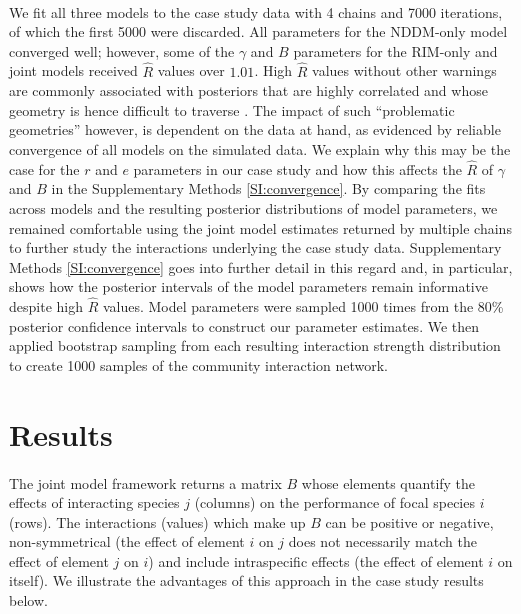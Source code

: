 \documentclass[a4,12pt]{article}
\begin{document}
\begin{refsection}
        \paragraph{}
        We fit all three models to the case study data with 4 chains and 7000 iterations, of which the first 5000 were discarded. All parameters for the NDDM-only model converged well; however, some of the $\gamma$ and $B$ parameters for the RIM-only and joint models received $\hat{R}$ values over $1.01$. High $\hat{R}$ values without other warnings are commonly associated with posteriors that are highly correlated and whose geometry is hence difficult to traverse \parencite{Team2022}. The impact of such ``problematic geometries'' however, is dependent on the data at hand, as evidenced by reliable convergence of all models on the simulated data. We explain why this may be the case for the $r$ and $e$ parameters in our case study and how this affects the $\hat{R}$ of $\gamma$ and $B$ in the Supplementary Methods \ref{SI:convergence}. By comparing the fits across models and the resulting posterior distributions of model parameters, we remained comfortable using the joint model estimates returned by multiple chains to further study the interactions underlying the case study data. Supplementary Methods \ref{SI:convergence} goes into further detail in this regard and, in particular, shows how the posterior intervals of the model parameters remain informative despite high $\hat{R}$ values. Model parameters were sampled 1000 times from the 80\% posterior confidence intervals to construct our parameter estimates. We then applied bootstrap sampling from each resulting interaction strength distribution to create 1000 samples of the community interaction network.

\section{Results}
    
    \paragraph{}
    The joint model framework returns a matrix $B$ whose elements quantify the effects of interacting species $j$ (columns) on the performance of focal species $i$ (rows). The interactions (values) which make up $B$ can be positive or negative, non-symmetrical (the effect of element $i$ on $j$ does not necessarily match the effect of element $j$ on $i$) and include intraspecific effects (the effect of element $i$ on itself). We illustrate the advantages of this approach in the case study results below. 



\end{refsection}
\end{document}

